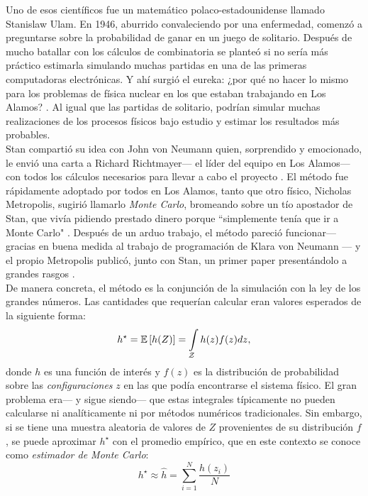 Uno de esos científicos fue un matemático polaco-estadounidense llamado Stanislaw Ulam. En 1946, aburrido convaleciendo por una enfermedad, comenzó a preguntarse sobre la probabilidad de ganar en un juego de solitario. Después de mucho batallar con los cálculos de combinatoria se planteó si no sería más práctico estimarla simulando muchas partidas en una de las primeras computadoras electrónicas. Y ahí surgió el eureka: ¿por qué no hacer lo mismo para los problemas de física nuclear en los que estaban trabajando en Los Alamos? \parencite{Eckhardt87}. Al igual que las partidas de solitario, podrían simular muchas realizaciones de los procesos físicos bajo estudio y estimar los resultados más probables.\\ 

Stan compartió su idea con John von Neumann quien, sorprendido y emocionado, le envió una carta a Richard Richtmayer--- el líder del equipo en Los Alamos--- con todos los cálculos necesarios para llevar a cabo el proyecto \parencite{vonNeumann47}. El método fue rápidamente adoptado por todos en Los Alamos, tanto que otro físico, Nicholas Metropolis, sugirió llamarlo \textit{Monte Carlo}, bromeando sobre un tío apostador de Stan, que vivía pidiendo prestado dinero porque ``simplemente tenía que ir a Monte Carlo" \parencite{Metropolis87}. Después de un arduo trabajo, el método pareció funcionar--- gracias en buena medida al trabajo de programación de Klara von Neumann \parencite{Haigh14}--- y el propio Metropolis publicó, junto con Stan, un primer paper presentándolo a grandes rasgos \parencite{MetropolisUlam49}.\\

De manera concreta, el método es la conjunción de la simulación con la ley de los grandes números. Las cantidades que requerían calcular eran valores esperados de la siguiente forma: 
\begin{equation}
\label{eq:IntegralMC}
h^\star = \mathbb{E}\left[ h(Z) \right]=\int\limits_\mathcal{Z} h(z)f(z)dz ,
\end{equation} 
donde $h$ es una función de interés y $f(z)$ es la distribución de probabilidad sobre las \textit{configuraciones} $z$ en las que podía encontrarse el sistema físico. El gran problema era--- y sigue siendo--- que estas integrales típicamente no pueden calcularse ni analíticamente ni por métodos numéricos tradicionales. Sin embargo, si se tiene una muestra aleatoria de valores de $Z$ provenientes de su distribución $f$, se puede aproximar $h^\star$ con el promedio empírico, que en este contexto se conoce como \textit{estimador de Monte Carlo}: 
\begin{equation*}
h^\star \approx \hat{h} = \sum\limits_{i=1}^N \dfrac{h(z_i)}{N}
\end{equation*}

